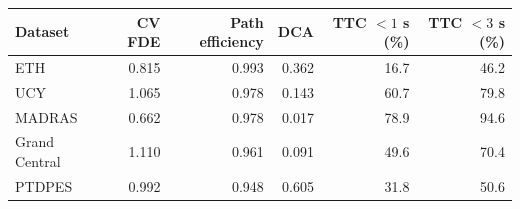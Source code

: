 \begin{tabular}{lrrrrr}
\hline
Dataset & CV FDE & Path efficiency & DCA & TTC $<1$ s (\%) & TTC $<3$ s (\%) \\
\hline
ETH & 0.815 & 0.993 & 0.362 & 16.7 & 46.2 \\
UCY & 1.065 & 0.978 & 0.143 & 60.7 & 79.8 \\
MADRAS & 0.662 & 0.978 & 0.017 & 78.9 & 94.6 \\
Grand Central & 1.110 & 0.961 & 0.091 & 49.6 & 70.4 \\
PTDPES & 0.992 & 0.948 & 0.605 & 31.8 & 50.6 \\
\hline
\end{tabular}
